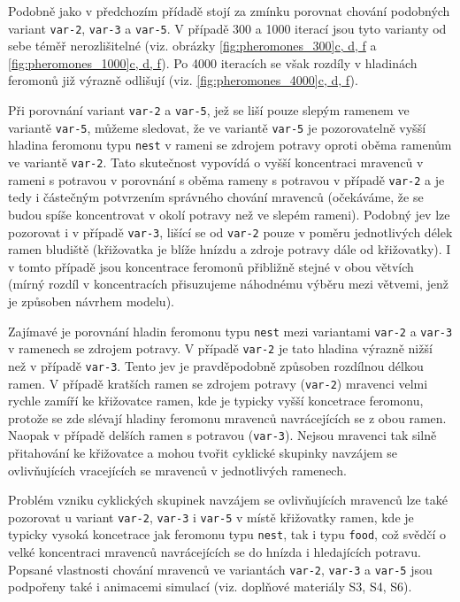\documentclass[10pt,a4paper,twocolumn]{article}
\begin{document}
Podobně jako v předchozím přídadě stojí za zmínku porovnat chování
podobných variant \texttt{var-2}, \texttt{var-3} a \texttt{var-5}. 
V případě 300 a 1000 iterací jsou tyto varianty od sebe téměř 
nerozlišitelné (viz. obrázky \hyperref[fig:pheromones_300]{\ref*{fig:pheromones_300}c, d, f}
a \hyperref[fig:pheromones_1000]{\ref*{fig:pheromones_1000}c, d, f}). Po 4000
iteracích se však rozdíly v hladinách feromonů již výrazně 
odlišují (viz. \hyperref[fig:pheromones_4000]{\ref*{fig:pheromones_4000}c, d, f}).

Při porovnání variant \texttt{var-2} a \texttt{var-5}, jež se liší
pouze slepým ramenem ve variantě \texttt{var-5}, můžeme sledovat, že
ve variantě \texttt{var-5} je pozorovatelně vyšší hladina feromonu
typu \texttt{nest} v rameni se zdrojem potravy oproti oběma ramenům
ve variantě \texttt{var-2}. Tato skutečnost vypovídá
o vyšší koncentraci mravenců v rameni s potravou v porovnání s oběma
rameny s potravou v případě \texttt{var-2} a je tedy i částečným 
potvrzením správného chování mravenců (očekáváme, že se budou 
spíše koncentrovat v okolí potravy než ve slepém rameni). Podobný jev
lze pozorovat i v případě \texttt{var-3}, lišící se od \texttt{var-2}
pouze v poměru jednotlivých délek ramen bludiště (křižovatka je blíže 
hnízdu a zdroje potravy dále od křižovatky). I v tomto případě jsou
koncentrace feromonů přibližně stejné v obou větvích (mírný rozdíl 
v koncentracích přisuzujeme náhodnému výběru mezi větvemi, 
jenž je způsoben návrhem modelu). 

Zajímavé je porovnání hladin feromonu typu \texttt{nest} mezi variantami 
\texttt{var-2} a \texttt{var-3} v ramenech se zdrojem potravy. 
V případě \texttt{var-2} je tato hladina výrazně nižší než v případě
\texttt{var-3}. Tento jev je pravděpodobně způsoben rozdílnou délkou 
ramen. V případě kratších ramen se zdrojem potravy 
(\texttt{var-2}) mravenci velmi rychle zamíří ke křižovatce ramen,
kde je typicky vyšší koncetrace feromonu, protože se zde slévají
hladiny feromonu mravenců navrácejících se z obou ramen. Naopak v 
případě delších ramen s potravou (\texttt{var-3}). Nejsou mravenci
tak silně přitahování ke křižovatce a mohou tvořit cyklické skupinky
navzájem se ovlivňujících vracejících se mravenců v jednotlivých 
ramenech. 

Problém vzniku cyklických skupinek navzájem se ovlivňujících
mravenců lze také pozorovat u variant \texttt{var-2}, \texttt{var-3} i 
\texttt{var-5} v místě křižovatky ramen, kde je typicky
vysoká koncetrace jak feromonu typu \texttt{nest}, tak i typu 
\texttt{food}, což svědčí o velké koncentraci mravenců navrácejících
se do hnízda i hledajících potravu. Popsané vlastnosti chování mravenců
ve variantách \texttt{var-2}, \texttt{var-3} a \texttt{var-5} jsou
podpořeny také i animacemi simulací (viz. doplňové materiály S3, S4, S6).
\end{document}
